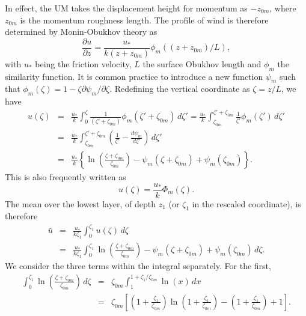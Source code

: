 \documentclass{UMDP_article}
\begin{document}
In effect, the UM takes the displacement height for momentum as
$-z_{0m}$, where $z_{0m}$ is the momentum roughness length. The
profile of wind is therefore determined by Monin-Obukhov theory as
\begin{equation}
  \frac{\partial u}{\partial z} = \frac{u_*}{k(z+z_{0m})} \phi_m((z+z_{0m})/L),
\end{equation}
with $u_*$ being the friction velocity, $L$ the surface Obukhov length
and $\phi_m$ the similarity function. It is common practice to
introduce a new function $\psi_m$ such that
$\phi_m(\zeta)=1-\zeta \partial \psi_m / \partial \zeta.$ Redefining
the vertical coordinate as $\zeta=z/L$, we have
\begin{eqnarray}
  u(\zeta)  &=& \frac{u_*}{k} \int_{0}^{\zeta} \frac{1}{(\zeta'+\zeta_{0m})}
  \phi_m(\zeta'+\zeta_{0m}) \, d\zeta' =
  \frac{u_*}{k} \int_{\zeta_{0m}}^{\zeta'+\zeta_{0m}}
  \frac{1}{\zeta'} \phi_m(\zeta') \, d\zeta' \\
  &=& \frac{u_*}{k} \int_{\zeta_{0m}}^{\zeta'+\zeta_{0m}} \left ( \frac{1}{\zeta'} -
    \frac{d\psi_m}{d\zeta'} \right ) \, d\zeta' \nonumber \\
  &=& \frac{u_*}{k} \left \{ \ln \left ( \frac{\zeta+\zeta_{0m}}{\zeta_{0m}}
    \right ) - \psi_m(\zeta+\zeta_{0m}) + \psi_m (\zeta_{0m}) \right \}.
  \nonumber
\end{eqnarray}
This is also frequently written as
\begin{equation}
  u(\zeta) = \frac{u_*}{k} \Phi_m(\zeta).
\end{equation}
The mean over the lowest layer, of depth $z_1$ (or $\zeta_1$ in the
rescaled coordinate), is therefore
\begin{eqnarray}
  \bar u &=& \frac{u_*}{k\zeta_1} \int_0^{\zeta_1} u(\zeta)  \, d \zeta \\
  &=& \frac{u_*}{k\zeta_1} \int_0^{\zeta_1}
  \ln \left ( \frac{\zeta+\zeta_{0m}}{\zeta_{0m}} \right )
  - \psi_m(\zeta+\zeta_{0m}) + \psi_m (\zeta_{0m}) \, d \zeta.
  \nonumber
\end{eqnarray}
We consider the three terms within the integral separately. For the
first,
\begin{eqnarray}
  \int_0^{\zeta_1} \ln \left ( \frac{\zeta+\zeta_{0m}}{\zeta_{0m}} \right ) \, d \zeta
  &=& \zeta_{0m} \int_1^{1+\zeta_1/\zeta_{0m}} \ln(x) \, dx \\
  &=& \zeta_{0m} \left [ \left ( 1+ \frac{\zeta_1}{\zeta_{0m}} \right ) \ln
    \left ( 1+ \frac{\zeta_1}{\zeta_{0m}} \right ) -
    \left ( 1+ \frac{\zeta_1}{\zeta_{0m}} \right ) +1 \right ] . \nonumber
\end{eqnarray}
\end{document}
